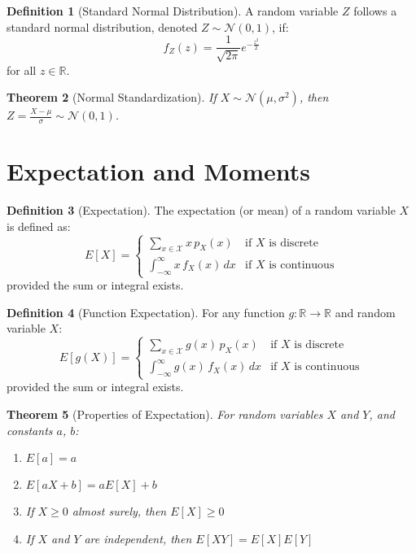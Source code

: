 \documentclass[12pt,a4paper]{article}
\theoremstyle{plain}
\newtheorem{theorem}{Theorem}[section]
\theoremstyle{definition}
\newtheorem{definition}[theorem]{Definition}
\begin{document}
\begin{definition}[Standard Normal Distribution]
A random variable $Z$ follows a standard normal distribution, denoted $Z \sim \mathcal{N}(0,1)$, if:
\begin{equation}
f_Z(z) = \frac{1}{\sqrt{2\pi}} e^{-\frac{z^2}{2}}
\end{equation}
for all $z \in \mathbb{R}$.
\end{definition}

\begin{theorem}[Normal Standardization]
If $X \sim \mathcal{N}(\mu, \sigma^2)$, then $Z = \frac{X - \mu}{\sigma} \sim \mathcal{N}(0,1)$.
\end{theorem}

\section{Expectation and Moments}

\begin{definition}[Expectation]
The expectation (or mean) of a random variable $X$ is defined as:
\begin{equation}
E[X] = 
\begin{cases}
\sum_{x \in \mathcal{X}} x \, p_X(x) & \text{if $X$ is discrete} \\
\int_{-\infty}^{\infty} x \, f_X(x) \, dx & \text{if $X$ is continuous}
\end{cases}
\end{equation}
provided the sum or integral exists.
\end{definition}

\begin{definition}[Function Expectation]
For any function $g: \mathbb{R} \rightarrow \mathbb{R}$ and random variable $X$:
\begin{equation}
E[g(X)] = 
\begin{cases}
\sum_{x \in \mathcal{X}} g(x) \, p_X(x) & \text{if $X$ is discrete} \\
\int_{-\infty}^{\infty} g(x) \, f_X(x) \, dx & \text{if $X$ is continuous}
\end{cases}
\end{equation}
provided the sum or integral exists.
\end{definition}

\begin{theorem}[Properties of Expectation]
For random variables $X$ and $Y$, and constants $a$, $b$:
\begin{enumerate}[label=(\roman*)]
\item $E[a] = a$
\item $E[aX + b] = aE[X] + b$
\item If $X \geq 0$ almost surely, then $E[X] \geq 0$
\item If $X$ and $Y$ are independent, then $E[XY] = E[X]E[Y]$
\end{enumerate}
\end{theorem}
\end{document}
